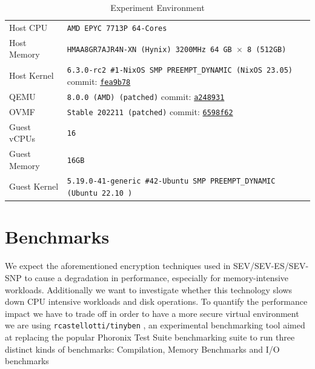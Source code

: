 \documentclass[twocolumn]{article}
\begin{document}
\begin{table}[ht]
    \small
    \centering
    \begin{tabular}{l|l}
        \hline
        Host CPU      & \texttt{AMD EPYC 7713P 64-Cores}                                            \\
        Host Memory   & \texttt{HMAA8GR7AJR4N-XN (Hynix) 3200MHz 64 GB $\times$ 8 (512GB)}          \\
        Host Kernel   & \texttt{6.3.0-rc2 \#1-NixOS SMP PREEMPT\_DYNAMIC (NixOS 23.05)} commit: \href{https://github.com/AMDESE/linux/tree/fea9b785bfa90e015c7d81526e36060da1bf01d1}{\texttt{fea9b78}}            \\
        QEMU          & \texttt{8.0.0 (AMD) (patched)} commit: \href{https://github.com/AMDESE/qemu/tree/a248931547843b9edb0f3b0c7d6d0c76ffdf7659}{\texttt{a248931}}                                             \\
        OVMF          & \texttt{Stable 202211 (patched)} commit: \href{https://github.com/AMDESE/ovmf/commit/6598f62bda4eb884c65d6c0aed7ede64258a41d8}{\texttt{6598f62}}                                     \\
        Guest vCPUs   & \texttt{16}                                                                 \\
        Guest Memory  & \texttt{16GB}                                                               \\
        Guest Kernel  & \texttt{5.19.0-41-generic \#42-Ubuntu SMP PREEMPT\_DYNAMIC (Ubuntu 22.10 )} \\ 
        \hline
    \end{tabular}
    \caption{Experiment Environment}
    \label{tab:experiment-environment}
\end{table}

\section{Benchmarks}
We expect the aforementioned encryption techniques used in SEV/SEV-ES/SEV-SNP to cause a degradation in performance, especially for memory-intensive workloads. Additionally we want to investigate whether this technology slows down CPU intensive workloads and disk operations. To quantify the performance impact we have to trade off in order to have a more secure virtual environment we are using \texttt{rcastellotti/tinyben} \cite{tinyben}, an experimental benchmarking tool aimed at replacing the popular Phoronix Test Suite \cite{pts} benchmarking suite to run three distinct kinds of benchmarks: Compilation, Memory Benchmarks and I/O benchmarks
\end{document}

